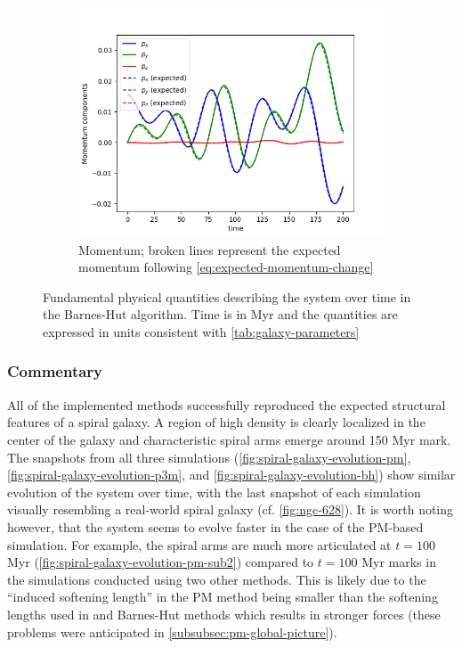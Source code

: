 \begin{figure}[htp]
    \vspace{0.5cm}

    \begin{subfigure}[b]{0.45\textwidth}
        \centering
        \includegraphics[width=\textwidth]{img/bh/momentum.png}
        \caption{Momentum; broken lines represent the expected momentum following \autoref{eq:expected-momentum-change}}
        \label{fig:physical-quantities-bh-sub3}
    \end{subfigure}

    \caption{Fundamental physical quantities describing the system over time in the Barnes-Hut algorithm.
        Time is in Myr and the quantities are expressed in units consistent with \autoref{tab:galaxy-parameters}}
    \label{fig:physical-quantities-bh}
\end{figure}

\subsubsection{Commentary}
All of the implemented methods successfully reproduced the expected structural features of a spiral galaxy.
A region of high density is clearly localized in the center of the galaxy and characteristic spiral arms emerge around 150 Myr mark.
The snapshots from all three simulations (\autoref{fig:spiral-galaxy-evolution-pm}, \autoref{fig:spiral-galaxy-evolution-p3m}, and \autoref{fig:spiral-galaxy-evolution-bh}) show similar evolution of the system over time, with the last snapshot of each simulation visually resembling a real-world spiral galaxy (cf. \autoref{fig:ngc-628}).
It is worth noting however, that the system seems to evolve faster in the case of the PM-based simulation.
For example, the spiral arms are much more articulated at $t=100$ Myr (\autoref{fig:spiral-galaxy-evolution-pm-sub2}) compared to $t=100$ Myr marks in the simulations conducted using two other methods.
This is likely due to the ``induced softening length'' in the PM method being smaller than the softening lengths used in \PThreeM{} and Barnes-Hut methods which results in stronger forces (these problems were anticipated in \autoref{subsubsec:pm-global-picture}).

